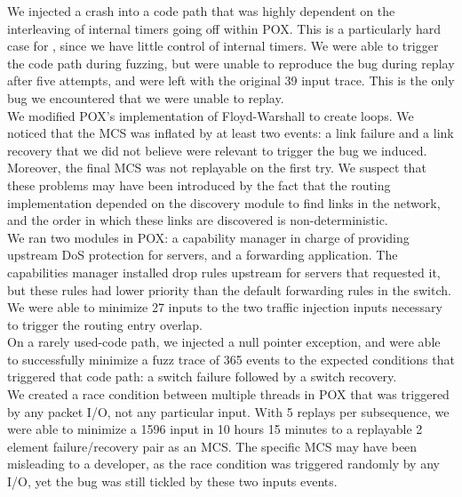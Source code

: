 We injected a crash into a code path that was highly dependent on the
interleaving of internal timers going off within POX. This is a particularly
hard case for \projectname, since we have little control of internal timers.
We were able to trigger the code path during fuzzing, but were unable to
reproduce the bug during replay after five attempts, and were left with the
original 39 input trace. This is the only bug we encountered that we were
unable to replay.\\[0.5ex]
%
We modified POX's implementation of Floyd-Warshall to create loops.
We noticed that the MCS was inflated by at least two events: a link failure
and a link recovery that we did not believe were relevant to trigger the bug we
induced. Moreover, the final MCS was not replayable on the first try.
We suspect that these problems may have been introduced by the fact that the
routing implementation depended on the discovery module to find links in the
network, and the order in which these links are discovered is
non-deterministic.\\[0.5ex]
%
We ran two modules in POX: a capability manager in charge of providing
upstream DoS protection for servers, and a forwarding application. The
capabilities manager installed drop rules upstream for servers that requested
it, but these rules had lower priority than the default forwarding rules in
the switch. We were able to minimize 27 inputs to the two traffic injection
inputs necessary to trigger the routing entry overlap.\\[0.5ex]
%
On a rarely used-code path, we injected a null pointer exception,
and were able to successfully minimize a fuzz trace of 365 events to the
expected conditions that triggered that code path: a switch failure followed
by a switch recovery.\\[0.5ex]
%
We created a race condition between multiple threads in POX that was
triggered by any packet I/O, not any particular input. With 5 replays per
subsequence, we were able to minimize a 1596 input in 10 hours 15 minutes to a
replayable 2 element failure/recovery pair as an MCS.
The specific MCS may have been misleading to a developer, as the race condition
was triggered randomly by any I/O, yet the bug was still tickled by these two
inputs events.\\[0.5ex]
%
